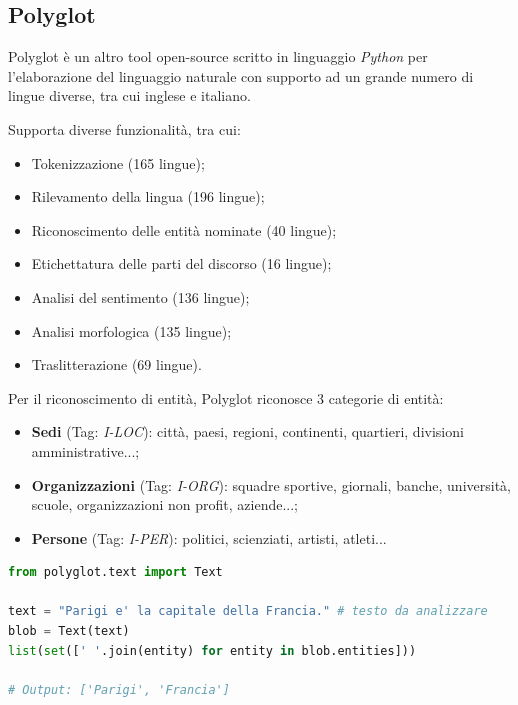 \documentclass[a4paper,11pt]{article}
\begin{document}
\subsection{Polyglot}
\label{extractor:polyglot}
Polyglot è un altro tool open-source scritto in linguaggio \textit{Python} per l'elaborazione del linguaggio naturale con supporto ad un grande numero di lingue diverse, tra cui inglese e italiano. \cite{polyglot}

Supporta diverse funzionalità, tra cui:

\begin{itemize}
	\item Tokenizzazione (165 lingue);
	\item Rilevamento della lingua (196 lingue);
	\item Riconoscimento delle entità nominate (40 lingue);
	\item Etichettatura delle parti del discorso (16 lingue);
	\item Analisi del sentimento (136 lingue);
	\item Analisi morfologica (135 lingue);
	\item Traslitterazione (69 lingue).
\end{itemize}

Per il riconoscimento di entità, Polyglot riconosce 3 categorie di entità:

\begin{itemize}
	\item \textbf{Sedi} (Tag: \textit{I-LOC}): città, paesi, regioni, continenti, quartieri, divisioni amministrative...;
	\item \textbf{Organizzazioni} (Tag: \textit{I-ORG}): squadre sportive, giornali, banche, università, scuole, organizzazioni non profit, aziende...;
	\item \textbf{Persone} (Tag: \textit{I-PER}): politici, scienziati, artisti, atleti...\newline
\end{itemize}

\begin{lstlisting}[basicstyle=\small, language=python, frame=single, caption={Esempio di codice Python per l'estrazione di entità con \textit{Polyglot}.},captionpos=b]
from polyglot.text import Text

text = "Parigi e' la capitale della Francia." # testo da analizzare
blob = Text(text)
list(set([' '.join(entity) for entity in blob.entities]))

# Output: ['Parigi', 'Francia']
\end{lstlisting}
\end{document}
